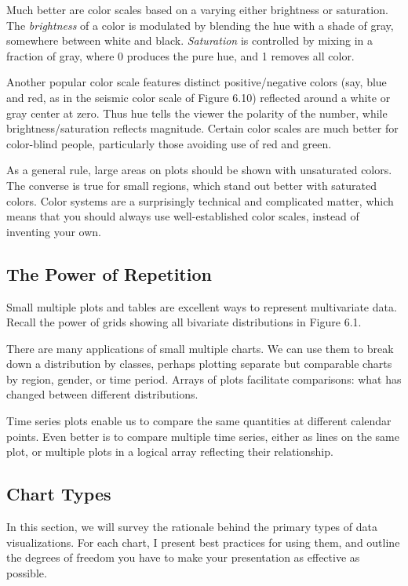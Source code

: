 \documentclass[10pt]{article}
\begin{document}
Much better are color scales based on a varying either brightness or saturation. The \emph{brightness} of a color is modulated by blending the hue with a shade of gray, somewhere between white and black. \emph{Saturation} is controlled by mixing in a fraction of gray, where 0 produces the pure hue, and 1 removes all color.

Another popular color scale features distinct positive/negative colors (say, blue and red, as in the seismic color scale of Figure 6.10) reflected around a white or gray center at zero. Thus hue tells the viewer the polarity of the number, while brightness/saturation reflects magnitude. Certain color scales are much better for color-blind people, particularly those avoiding use of red and green.

As a general rule, large areas on plots should be shown with unsaturated colors. The converse is true for small regions, which stand out better with saturated colors. Color systems are a surprisingly technical and complicated matter, which means that you should always use well-established color scales, instead of inventing your own.

\subsection{The Power of Repetition}
Small multiple plots and tables are excellent ways to represent multivariate data. Recall the power of grids showing all bivariate distributions in Figure 6.1.

There are many applications of small multiple charts. We can use them to break down a distribution by classes, perhaps plotting separate but comparable charts by region, gender, or time period. Arrays of plots facilitate comparisons: what has changed between different distributions.

Time series plots enable us to compare the same quantities at different calendar points. Even better is to compare multiple time series, either as lines on the same plot, or multiple plots in a logical array reflecting their relationship.

\subsection{Chart Types}
In this section, we will survey the rationale behind the primary types of data visualizations. For each chart, I present best practices for using them, and outline the degrees of freedom you have to make your presentation as effective as possible.
\end{document}
